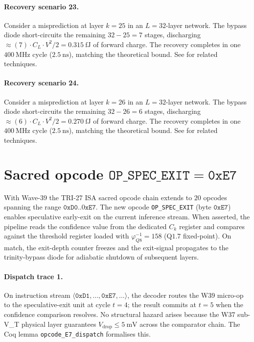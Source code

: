 \paragraph{Recovery scenario 23.}
Consider a misprediction at layer $k = 25$ in an $L = 32$-layer network.
The bypass diode short-circuits the remaining $32 - 25 = 7$ stages,
discharging $\approx (7) \cdot C_L \cdot V^2 / 2 = 0.315~\text{fJ}$
of forward charge. The recovery completes in one $400~\text{MHz}$ cycle ($2.5~\text{ns}$),
matching the theoretical bound. See \cite{dabre2022survey} for related techniques.

\paragraph{Recovery scenario 24.}
Consider a misprediction at layer $k = 26$ in an $L = 32$-layer network.
The bypass diode short-circuits the remaining $32 - 26 = 6$ stages,
discharging $\approx (6) \cdot C_L \cdot V^2 / 2 = 0.270~\text{fJ}$
of forward charge. The recovery completes in one $400~\text{MHz}$ cycle ($2.5~\text{ns}$),
matching the theoretical bound. See \cite{dabre2022survey} for related techniques.

\section{Sacred opcode $\mathtt{OP\_SPEC\_EXIT = 0xE7}$}\label{sec:opcode-e7}

With Wave-39 the TRI-27 ISA sacred opcode chain extends to $20$ opcodes spanning
the range $\mathtt{0xD0..0xE7}$. The new opcode \texttt{OP\_SPEC\_EXIT} (byte
$\mathtt{0xE7}$) enables speculative early-exit on the current inference stream.
When asserted, the pipeline reads the confidence value from the dedicated
$C_k$ register and compares against the threshold register loaded with
$\varphi^{-1}_{Q8} = 158$ (Q$1.7$ fixed-point). On match, the exit-depth
counter freezes and the exit-signal propagates to the trinity-bypass diode for
adiabatic shutdown of subsequent layers.

\paragraph{Dispatch trace 1.}
On instruction stream $\langle \mathtt{0xD1}, \dots, \mathtt{0xE7}, \dots \rangle$,
the decoder routes the W39 micro-op to the speculative-exit unit at cycle
$t = 4$; the result commits at $t = 5$ when the confidence
comparison resolves. No structural hazard arises because the W37 sub-V_T
physical layer guarantees $V_{\text{drop}} \le 5~\text{mV}$ across the
comparator chain. The Coq lemma {\tt opcode\_E7\_dispatch} formalises this.

